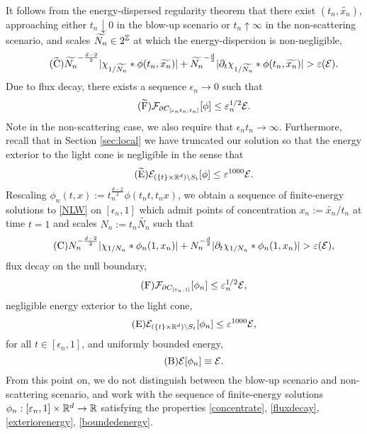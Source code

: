 It follows from the energy-dispersed regularity theorem that there exist $(t_n, \widetilde{x_n})$, approaching either $t_n \downarrow 0$ in the blow-up scenario or $t_n \uparrow \infty$ in the non-scattering scenario, and scales $\widetilde{N_n} \in 2^\mathbb Z$ at which the energy-dispersion is non-negligible, 
	\begin{equation}\tag{$\widetilde{\mathrm{C}}$}
		\widetilde{N_n}^{- \frac{d -2}{2}} |\chi_{1/\widetilde{N_n}} * \phi (t_n, \widetilde{x_n})| + \widetilde{N_n}^{-\frac{d}{2}} |\partial_t \chi_{1/\widetilde{N_n}} * \phi (t_n, \widetilde{x_n})| > \epsilon (\cE).
	\end{equation}
Due to flux decay, there exists a sequence $\epsilon_n \to 0$ such that  
	\begin{equation}\tag{$\widetilde{\mathrm{F}}$}
		\cF_{\partial C_{[\epsilon_n t_n, t_n]}} [\phi]  \leq \epsilon_n^{1/2} \cE.
	\end{equation}
Note in the non-scattering case, we also require that $\epsilon_n t_n \to \infty$. Furthermore, recall that in Section \ref{sec:local} we have truncated our solution so that the energy exterior to the light cone is negligible in the sense that 
	\begin{equation}\tag{$\widetilde{\mathrm{E}}$}
		\cE_{(\{t\} \times \R^d) \setminus S_t} [\phi]
			\leq \epsilon^{1000} \cE .
	\end{equation}
Rescaling $\phi_n (t, x) := t_n^{\frac{d - 2}{2}}\phi(t_n t, t_n x)$, we obtain a sequence of finite-energy solutions to \eqref{NLW} on $ [\epsilon_n, 1]$ which admit points of concentration $x_n := \widetilde{x_n}/t_n$ at time $t = 1$ and scales $N_n := t_n \widetilde{N_n}$ such that 
		\begin{equation}\tag{${\mathrm{C}}$}\label{eq:concentrate}
		N_n^{- \frac{d -2}{2}} |\chi_{1/N_n} * \phi_n (1, x_n)| + N_n^{-\frac{d}{2}} |\partial_t \chi_{1/N_n} * \phi_n (1, x_n)| > \epsilon (\cE),
	\end{equation}
flux decay on the null boundary, 	
	\begin{equation}\tag{${\mathrm{F}}$}\label{eq:fluxdecay}
		\cF_{\partial C_{[\epsilon_n , 1]}} [\phi_n]  \leq \epsilon_n^{1/2} \cE,
	\end{equation}
negligible energy exterior to the light cone, 	
	\begin{equation}\tag{${\mathrm{E}}$}\label{eq:exteriorenergy}
		\cE_{(\{t\} \times \R^d) \setminus S_t} [\phi_n]
			\leq \epsilon^{1000} \cE ,
	\end{equation}
for all $t \in [\epsilon_n, 1]$, and uniformly bounded energy, 
	\begin{equation}\tag{${\mathrm{B}}$}\label{eq:boundedenergy}
		\cE [\phi_n] \equiv \cE.
	\end{equation}
From this point on, we do not distinguish between the blow-up scenario and non-scattering scenario, and work with the sequence of finite-energy solutions $\phi_n : [\varepsilon_n, 1] \times \mathbb R^d \to \mathbb R$ satisfying the properties \eqref{concentrate}, \eqref{fluxdecay}, \eqref{exteriorenergy}, \eqref{boundedenergy}. 


